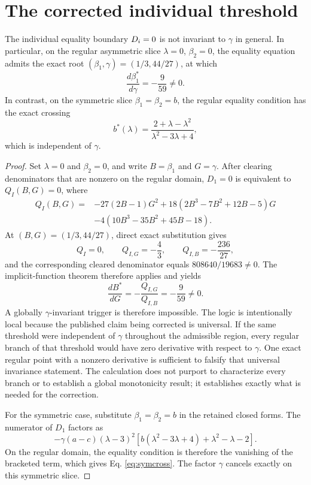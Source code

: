 \section{The corrected individual threshold}

\begin{proposition}\label{prop:individual}
The individual equality boundary $D_i=0$ is not invariant to $\gamma$ in general. In particular, on the regular asymmetric slice $\lambda=0$, $\beta_2=0$, the equality equation admits the exact root $(\beta_1,\gamma)=(1/3,44/27)$, at which
\[
 \frac{d\beta_1^*}{d\gamma}=-\frac{9}{59}\neq0.
\]
In contrast, on the symmetric slice $\beta_1=\beta_2=b$, the regular equality condition has the exact crossing
\begin{equation}\label{eq:symcross}
 b^*(\lambda)=\frac{2+\lambda-\lambda^2}{\lambda^2-3\lambda+4},
\end{equation}
which is independent of $\gamma$.
\end{proposition}

\begin{proof}
Set $\lambda=0$ and $\beta_2=0$, and write $B=\beta_1$ and $G=\gamma$. After clearing denominators that are nonzero on the regular domain, $D_1=0$ is equivalent to $Q_I(B,G)=0$, where
\begin{align*}
Q_I(B,G)=&-27(2B-1)G^2
 +18(2B^3-7B^2+12B-5)G\\
&-4(10B^3-35B^2+45B-18).
\end{align*}
At $(B,G)=(1/3,44/27)$, direct exact substitution gives
\[
 Q_I=0,\qquad Q_{I,G}=-\frac43,\qquad Q_{I,B}=-\frac{236}{27},
\]
and the corresponding cleared denominator equals $808640/19683\neq0$. The implicit-function theorem therefore applies and yields
\[
 \frac{dB^*}{dG}=-\frac{Q_{I,G}}{Q_{I,B}}=-\frac{9}{59}\neq0.
\]
A globally $\gamma$-invariant trigger is therefore impossible. The logic is intentionally local because the published claim being corrected is universal. If the same threshold were independent of $\gamma$ throughout the admissible region, every regular branch of that threshold would have zero derivative with respect to $\gamma$. One exact regular point with a nonzero derivative is sufficient to falsify that universal invariance statement. The calculation does not purport to characterize every branch or to establish a global monotonicity result; it establishes exactly what is needed for the correction.

For the symmetric case, substitute $\beta_1=\beta_2=b$ in the retained closed forms. The numerator of $D_1$ factors as
\[
 -\gamma(a-c)(\lambda-3)^2
 \left[b(\lambda^2-3\lambda+4)+\lambda^2-\lambda-2\right].
\]
On the regular domain, the equality condition is therefore the vanishing of the bracketed term, which gives Eq. \eqref{eq:symcross}. The factor $\gamma$ cancels exactly on this symmetric slice.\qedhere
\end{proof}

